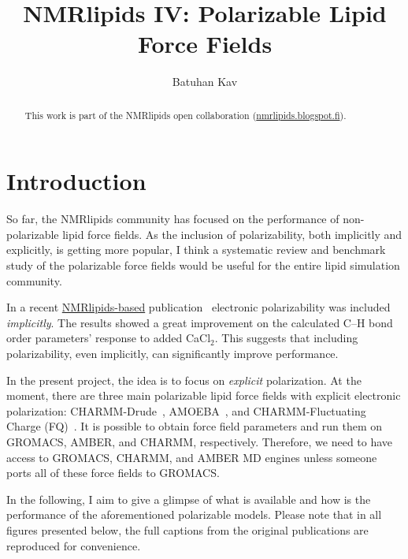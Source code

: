 \documentclass[journal=jpcbfk,manuscript=article,layout=twocolumn]{achemso}
\author{Batuhan Kav}
\affiliation[Forschungszentrum J\"ulich]{Institute of Complex Systems: Structural Biochemistry, Forschungszentrum J\"ulich, 52425 J\"ulich, Germany}
\title{NMRlipids IV: Polarizable Lipid Force Fields}
\begin{document}
\begin{abstract}
This work is part of the NMRlipids open collaboration (\url{nmrlipids.blogspot.fi}).
\end{abstract}

\maketitle

\section{Introduction}
So far, the NMRlipids community has focused on the performance of non-polarizable lipid force fields. As the inclusion of polarizability, both implicitly and explicitly, is getting more popular, I think a systematic review and benchmark study of the polarizable force fields would be useful for the entire lipid simulation community.

In a recent \href{http://nmrlipids.blogspot.fi/2018/04/new-nmrlipids-related-publication.html}{NMRlipids-based} publication~\cite{Melcr:2018a} electronic polarizability was included \emph{implicitly}. The results showed a great improvement on the calculated C--H bond order parameters' response to added CaCl$_{2}$. This suggests that including polarizability, even implicitly, can significantly improve performance.

In the present project, the idea is to focus on \emph{explicit} polarization.
At the moment, there are three main polarizable lipid force fields with explicit electronic polarization: CHARMM-Drude~\cite{li2017drude}, AMOEBA~\cite{chu2018anionicpolarizable,chu2018polarizable}, and CHARMM-Fluctuating Charge (FQ)~\cite{lucas2012charge}. It is possible to obtain force field parameters and run them on GROMACS, AMBER, and CHARMM, respectively. Therefore, we need to have access to GROMACS, CHARMM, and AMBER MD engines unless someone ports all of these force fields to GROMACS.

In the following, I aim to give a glimpse of what is available and how
is the performance of the aforementioned polarizable models.
Please note that in all figures presented below, the full captions from the original publications are reproduced for convenience.

\end{document}
